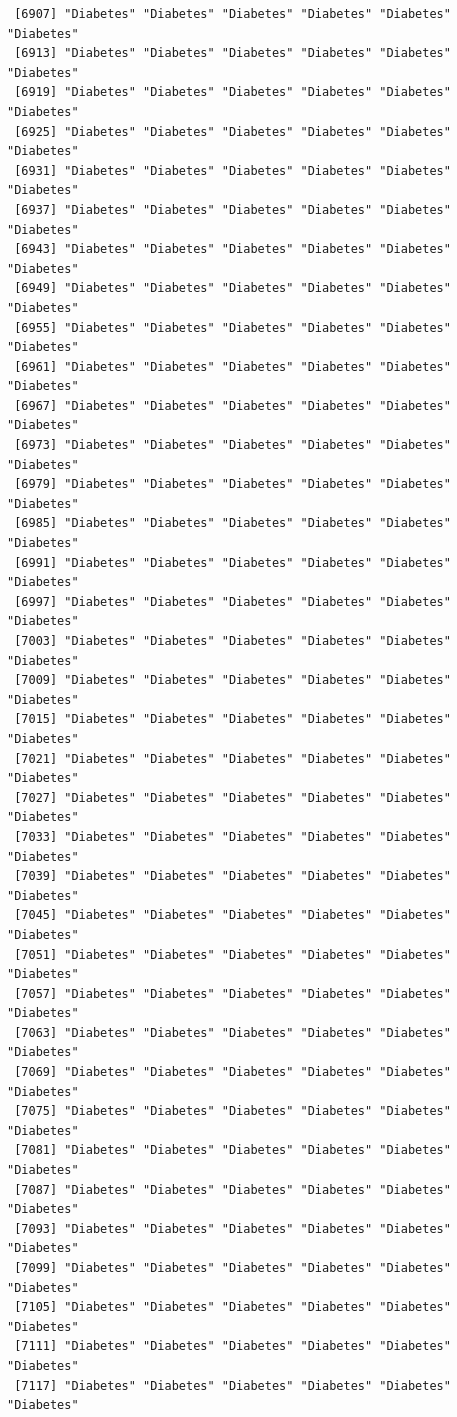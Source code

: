 \documentclass[
  letterpaper,
  DIV=11,
  numbers=noendperiod]{scrartcl}
\begin{document}
\begin{verbatim}
 [6907] "Diabetes" "Diabetes" "Diabetes" "Diabetes" "Diabetes" "Diabetes"
 [6913] "Diabetes" "Diabetes" "Diabetes" "Diabetes" "Diabetes" "Diabetes"
 [6919] "Diabetes" "Diabetes" "Diabetes" "Diabetes" "Diabetes" "Diabetes"
 [6925] "Diabetes" "Diabetes" "Diabetes" "Diabetes" "Diabetes" "Diabetes"
 [6931] "Diabetes" "Diabetes" "Diabetes" "Diabetes" "Diabetes" "Diabetes"
 [6937] "Diabetes" "Diabetes" "Diabetes" "Diabetes" "Diabetes" "Diabetes"
 [6943] "Diabetes" "Diabetes" "Diabetes" "Diabetes" "Diabetes" "Diabetes"
 [6949] "Diabetes" "Diabetes" "Diabetes" "Diabetes" "Diabetes" "Diabetes"
 [6955] "Diabetes" "Diabetes" "Diabetes" "Diabetes" "Diabetes" "Diabetes"
 [6961] "Diabetes" "Diabetes" "Diabetes" "Diabetes" "Diabetes" "Diabetes"
 [6967] "Diabetes" "Diabetes" "Diabetes" "Diabetes" "Diabetes" "Diabetes"
 [6973] "Diabetes" "Diabetes" "Diabetes" "Diabetes" "Diabetes" "Diabetes"
 [6979] "Diabetes" "Diabetes" "Diabetes" "Diabetes" "Diabetes" "Diabetes"
 [6985] "Diabetes" "Diabetes" "Diabetes" "Diabetes" "Diabetes" "Diabetes"
 [6991] "Diabetes" "Diabetes" "Diabetes" "Diabetes" "Diabetes" "Diabetes"
 [6997] "Diabetes" "Diabetes" "Diabetes" "Diabetes" "Diabetes" "Diabetes"
 [7003] "Diabetes" "Diabetes" "Diabetes" "Diabetes" "Diabetes" "Diabetes"
 [7009] "Diabetes" "Diabetes" "Diabetes" "Diabetes" "Diabetes" "Diabetes"
 [7015] "Diabetes" "Diabetes" "Diabetes" "Diabetes" "Diabetes" "Diabetes"
 [7021] "Diabetes" "Diabetes" "Diabetes" "Diabetes" "Diabetes" "Diabetes"
 [7027] "Diabetes" "Diabetes" "Diabetes" "Diabetes" "Diabetes" "Diabetes"
 [7033] "Diabetes" "Diabetes" "Diabetes" "Diabetes" "Diabetes" "Diabetes"
 [7039] "Diabetes" "Diabetes" "Diabetes" "Diabetes" "Diabetes" "Diabetes"
 [7045] "Diabetes" "Diabetes" "Diabetes" "Diabetes" "Diabetes" "Diabetes"
 [7051] "Diabetes" "Diabetes" "Diabetes" "Diabetes" "Diabetes" "Diabetes"
 [7057] "Diabetes" "Diabetes" "Diabetes" "Diabetes" "Diabetes" "Diabetes"
 [7063] "Diabetes" "Diabetes" "Diabetes" "Diabetes" "Diabetes" "Diabetes"
 [7069] "Diabetes" "Diabetes" "Diabetes" "Diabetes" "Diabetes" "Diabetes"
 [7075] "Diabetes" "Diabetes" "Diabetes" "Diabetes" "Diabetes" "Diabetes"
 [7081] "Diabetes" "Diabetes" "Diabetes" "Diabetes" "Diabetes" "Diabetes"
 [7087] "Diabetes" "Diabetes" "Diabetes" "Diabetes" "Diabetes" "Diabetes"
 [7093] "Diabetes" "Diabetes" "Diabetes" "Diabetes" "Diabetes" "Diabetes"
 [7099] "Diabetes" "Diabetes" "Diabetes" "Diabetes" "Diabetes" "Diabetes"
 [7105] "Diabetes" "Diabetes" "Diabetes" "Diabetes" "Diabetes" "Diabetes"
 [7111] "Diabetes" "Diabetes" "Diabetes" "Diabetes" "Diabetes" "Diabetes"
 [7117] "Diabetes" "Diabetes" "Diabetes" "Diabetes" "Diabetes" "Diabetes"

\end{verbatim}
\end{document}
